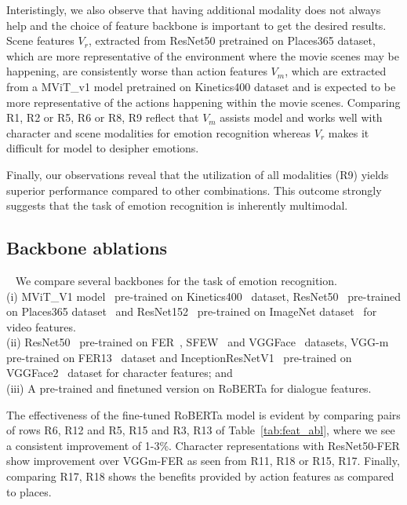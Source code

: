 Interistingly, we also observe that having additional modality does not always help and the choice of feature backbone is important to get the desired results.
Scene features $V_r$, extracted from ResNet50 pretrained on Places365 dataset, which are more representative of the environment where the movie scenes may be happening, are consistently worse than action features $V_m$, which are extracted from a MViT\_v1 model pretrained on Kinetics400 dataset and is expected to be more representative of the actions happening within the movie scenes. Comparing R1, R2 or R5, R6 or R8, R9 reflect that $V_m$ assists model and works well with character and scene modalities for emotion recognition whereas $V_r$ makes it difficult for model to desipher emotions.

Finally, our observations reveal that the utilization of all modalities (R9) yields superior performance compared to other combinations. This outcome strongly suggests that the task of emotion recognition is inherently multimodal.

\subsection{Backbone ablations}\
\label{sec:abl:backbones}
We compare several backbones for the task of emotion recognition. \\
(i) MViT\_V1 model~\cite{FanMViT2021} pre-trained on Kinetics400~\cite{CarreiraQuoVadis2017} dataset, ResNet50~\cite{resnet} pre-trained on Places365 dataset~\cite{places365} and ResNet152~\cite{resnet} pre-trained on ImageNet dataset~\cite{imagenet} for video features.\\
(ii) ResNet50~\cite{facefeat} pre-trained on FER~\cite{fer13}, SFEW~\cite{sfew} and VGGFace~\cite{vggface} datasets, VGG-m~\cite{facefeat} pre-trained on FER13~\cite{fer13} dataset and InceptionResNetV1~\cite{SzegedyInceptionNet2015} pre-trained on VGGFace2~\cite{CaoVGGF22018} dataset for character features; and \\
(iii) A pre-trained and finetuned version on RoBERTa for dialogue features.

The effectiveness of the fine-tuned RoBERTa model is evident by comparing pairs of rows R6, R12 and R5, R15 and R3, R13 of Table~\ref{tab:feat_abl}, where we see a consistent improvement of 1-3\%.
Character representations with ResNet50-FER show improvement over VGGm-FER as seen from R11, R18 or R15, R17.
Finally, comparing R17, R18 shows the benefits provided by action features as compared to places.

